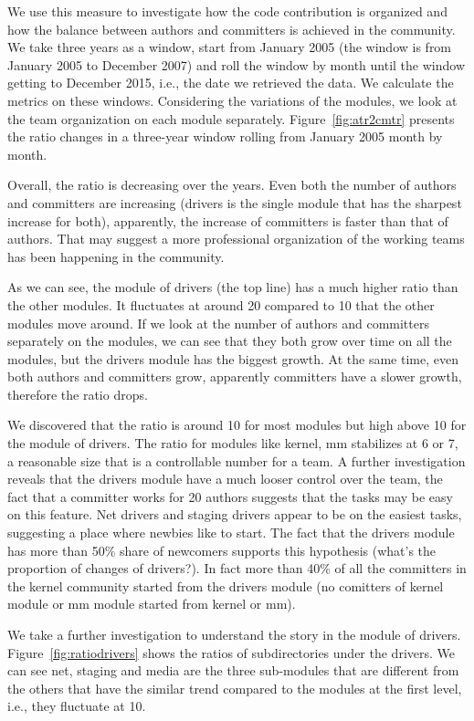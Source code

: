 \documentclass{sig-alternate-05-2015}
\begin{document}
We use this measure to investigate how 
the code contribution is organized and how the balance
between authors and committers is achieved in the community.
We take three years as a window, start from January 2005 (the window
is from January 2005 to December 2007) and roll the window by month until the window
getting to December 2015, i.e., the date we retrieved the data.
We calculate the metrics on these windows.
Considering the variations of the modules, we look at the team organization
on each module separately.
Figure~\ref{fig:atr2cmtr} presents the ratio changes in a three-year window
rolling from January 2005 month by month.

Overall, the ratio is decreasing over the years.
Even both the number of authors and committers are increasing (drivers is
the single module that has the sharpest increase for both), apparently, the
increase of committers is faster than that of authors.
That may suggest a more professional organization of the working teams 
has been happening in the community.

As we can see, the module of drivers (the top line) has a much higher ratio 
than the other modules. It fluctuates at around 20 compared to 10 that the
other modules move around.
If we look at the number of authors and committers separately on the modules, 
we can see that they both grow over time on all the modules, but the drivers 
module has the biggest growth. At the same time, even both authors and committers
 grow, apparently committers have a slower growth, therefore the ratio drops.

We discovered that the ratio is around 10 for most modules but high above 10 for
the module of drivers. 
The ratio for modules like kernel, mm stabilizes at 6 or 7, a reasonable %
size that is a controllable number for a team.
A further investigation reveals that the drivers module have a much looser control over
the team, the fact that a committer works for 20 authors suggests that the tasks 
may be easy on this feature. Net drivers and staging drivers appear to be on
the easiest tasks, suggesting a place where newbies like to start. The fact
that the drivers module has more than 50\% share of newcomers supports this
hypothesis (what's the proportion of changes of drivers?).
In fact more than 40\% of all the committers in the kernel community
started from the drivers module (no comitters of kernel module or mm module started from kernel or mm).

We take a further investigation to understand the story in the module of
drivers. Figure~\ref{fig:ratiodrivers} shows the ratios of subdirectories under the
drivers.  We can see net, staging and media are the three sub-modules that
are different from the others that have the similar trend compared to the
modules at the first level, i.e., they fluctuate at 10.
\end{document}
